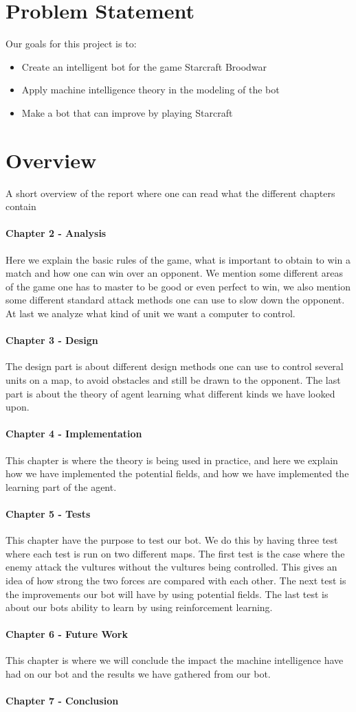 \section{Problem Statement}
	Our goals for this project is to:
	\begin{itemize}
		\item Create an intelligent bot for the game Starcraft Broodwar
		\item Apply machine intelligence theory in the modeling of the bot
		\item Make a bot that can improve by playing Starcraft
	\end{itemize}

\section{Overview}
	A short overview of the report where one can read what the different chapters contain

\paragraph*{Chapter 2 - Analysis}
Here we explain the basic rules of the game, what is important to obtain to win a match and how one can win over an opponent. We mention some different areas of the game one has to master to be good or even perfect to win, we also mention some different standard attack methods one can use to slow down the opponent. At last we analyze what kind of unit we want a computer to control.
\paragraph*{Chapter 3 - Design}
The design part is about different design methods one can use to control several units on a map, to avoid obstacles and still be drawn to the opponent. The last part is about the theory of agent learning what different kinds we have looked upon.
\paragraph*{Chapter 4 - Implementation}
This chapter is where the theory is being used in practice, and here we explain how we have implemented the potential fields, and how we have implemented the learning part of the agent.
\paragraph*{Chapter 5 - Tests}
This chapter have the purpose to test our bot. We do this by having three test where each test is run on two different maps. The first test is the case
where the enemy attack the vultures without the vultures being controlled. This gives an idea of how strong the two forces are compared with each other. The next test is the improvements our bot will have by using potential fields. The last test is about our bots ability to learn by using reinforcement learning.
\paragraph*{Chapter 6 - Future Work}
This chapter is where we will conclude the impact the machine intelligence have had on our bot and the results we have gathered from our bot.
\paragraph*{Chapter 7 - Conclusion}
